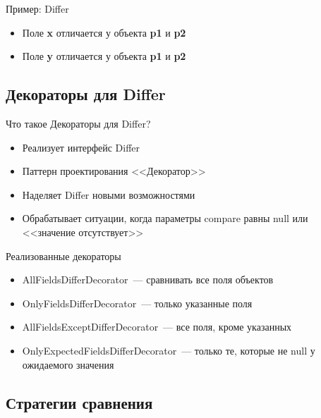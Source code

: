 \documentclass{beamer}
\begin{document}
\begin{frame}{Пример: Differ}
    \pause
    
    \pause
    \begin{itemize}
        \item {Поле \textbf{x} отличается у объекта \textbf{p1} и \textbf{p2} \pause}
        \item {Поле \textbf{y} отличается у объекта \textbf{p1} и \textbf{p2}}
    \end{itemize}
\end{frame}

\subsection{Декораторы для Differ}

\begin{frame}{Что такое Декораторы для Differ?}
    \pause
    \begin{itemize}
        \item {Реализует интерфейс Differ \pause}
        \item {Паттерн проектирования <<Декоратор>> \pause}
        \item {Наделяет Differ новыми возможностями \pause}
        \item {Обрабатывает ситуации, когда параметры compare равны null или <<значение отсутствует>>}
    \end{itemize}
\end{frame}

\begin{frame}{Реализованные декораторы}
    \pause
    \begin{itemize}
        \item {AllFieldsDifferDecorator~--- сравнивать все поля объектов \pause}
        \item {OnlyFieldsDifferDecorator~--- только указанные поля \pause}
        \item {AllFieldsExceptDifferDecorator~--- все поля, кроме указанных \pause}
        \item {OnlyExpectedFieldsDifferDecorator~--- только те, которые не null у ожидаемого значения}
    \end{itemize}
\end{frame}

\subsection{Стратегии сравнения}
\end{document}
